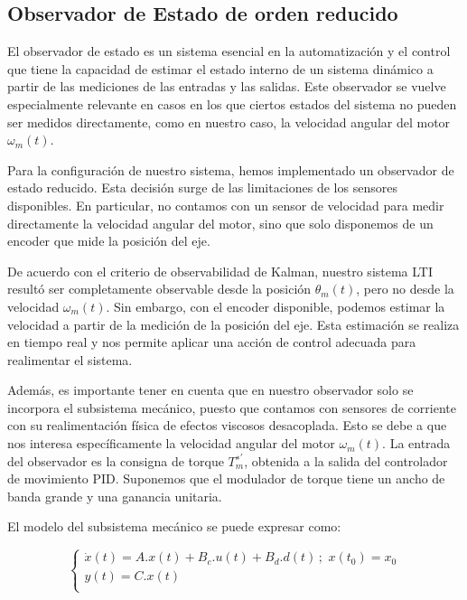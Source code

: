 \documentclass{article}
\begin{document}

\subsection{Observador de Estado de orden reducido}

El observador de estado es un sistema esencial en la automatización y el control que tiene la capacidad de 
estimar el estado interno de un sistema dinámico a partir de las mediciones de las entradas y las salidas. 
Este observador se vuelve especialmente relevante en casos en los que ciertos estados del sistema no pueden 
ser medidos directamente, como en nuestro caso, la velocidad angular del motor $\omega_m(t)$.

Para la configuración de nuestro sistema, hemos implementado un observador de estado reducido. Esta 
decisión surge de las limitaciones de los sensores disponibles. En particular, no contamos con un sensor 
de velocidad para medir directamente la velocidad angular del motor, sino que solo disponemos de un 
encoder que mide la posición del eje.

De acuerdo con el criterio de observabilidad de Kalman, nuestro sistema LTI resultó ser completamente 
observable desde la posición $\theta_m(t)$, pero no desde la velocidad $\omega_m(t)$. Sin embargo, con el 
encoder disponible, podemos estimar la velocidad a partir de la medición de la posición del eje. Esta 
estimación se realiza en tiempo real y nos permite 
aplicar una acción de control adecuada para realimentar el sistema.

Además, es importante tener en cuenta que en nuestro observador solo se incorpora el subsistema mecánico, 
puesto que contamos con sensores de corriente con su realimentación física de efectos viscosos desacoplada. 
Esto se debe a que nos interesa específicamente la velocidad angular del motor $\omega_m(t)$. La entrada del 
observador es la consigna de torque $𝑇_𝑚^{∗\prime}$, obtenida a la salida del controlador de movimiento PID. 
Suponemos que el modulador de torque tiene un ancho de banda grande y una ganancia unitaria.

El modelo del subsistema mecánico se puede expresar como:

\begin{equation}
    \begin{cases}
        \dot{x}(t) = A.x(t) + B_c.u(t) +B_d.d(t)  \, ; \,\, x(t_0) = x_0\\
        y(t) = C.x(t) \\
    \end{cases}
\end{equation}
\end{document}
